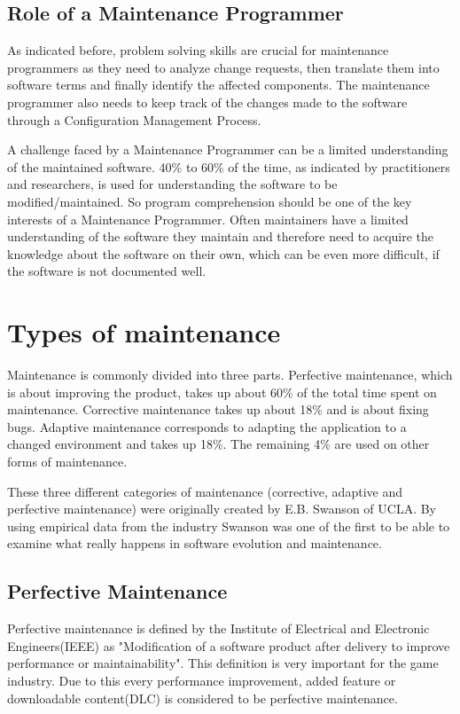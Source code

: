 \subsection{Role of a Maintenance Programmer}
\label{subsec:roleMaintenanceProgrammer}

As indicated before, problem solving skills are crucial for maintenance programmers as they need to analyze change requests, then translate them into software terms and finally identify the affected components. The maintenance programmer also needs to keep track of the changes made to the software through a Configuration Management Process.\citep{pigoski_software_2015}

A challenge faced by a Maintenance Programmer can be a limited understanding of the maintained software. 40\% to 60\% of the time, as indicated by practitioners and researchers, is used for understanding the software to be modified/maintained. So program comprehension should be one of the key interests of a Maintenance Programmer. Often maintainers have a limited understanding of the software they maintain and therefore need to acquire the knowledge about the software on their own, which can be even more difficult, if the software is not documented well.\citep{pigoski_software_2015}

\section{Types of maintenance}
\label{sec:typesOfMaintenance}
Maintenance is commonly divided into three parts. \citep{cote_model_1990} \newline
Perfective maintenance, which is about improving the product, takes up about 60\% of the total time spent on maintenance. Corrective maintenance takes up about 18\% and is about fixing bugs. Adaptive maintenance corresponds to adapting the application to a changed environment and takes up 18\%. The remaining 4\% are used on other forms of maintenance.\citep{jarman_testing_2010}

These three different categories of maintenance (corrective, adaptive and perfective maintenance) were originally created by E.B. Swanson of UCLA. By using empirical data from the industry Swanson was one of the first to be able to examine what really happens in software evolution and maintenance.\citep{pigoski_software_2015}

\subsection{Perfective Maintenance}
\label{subsec:perfectiveMaintenance}
Perfective maintenance is defined by the Institute of Electrical and Electronic Engineers(IEEE) as "Modification of a software product after delivery to improve performance or maintainability". \citep{ieee_software_1998} This definition is very important for the game industry. Due to this every performance improvement, added feature or downloadable content(DLC) is considered to be perfective maintenance.

